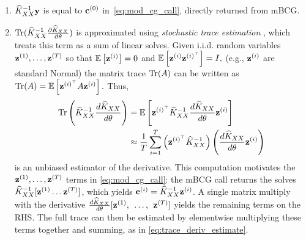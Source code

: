 \begin{enumerate}
  \item $\widehat{K}_{XX}^{-1}\mathbf{y}$ is equal to $\mathbf{c}^{(0)}$ in~\cref{eq:mod_cg_call}, directly returned from mBCG.

  \item $\tr{ \trainK^{-1} \frac{\partial \trainK}{\partial \theta} }$ is approximated using \emph{stochastic trace estimation} \cite{hutchinson1990stochastic,fitzsimons2016improved}, which treats this term as a sum of linear solves.
    Given i.i.d. random variables $\mathbf{z}^{(1)}, \ldots, \mathbf{z}^{(T)}$ so that $\operatorname*{\mathbb{E}} \left[ \mathbf{z}^{(i)} \right]=0$ and $\operatorname*{\mathbb{E}} \left[ \mathbf{z}^{(i)} \mathbf{z}^{(i)^\top} \right]=I,
    $ (e.g., $\mathbf{z}^{(i)}$ are standard Normal)
    the matrix trace $\tr{\bA}$ can be written as
    $
      \tr{\bA} = \Ev{\bz^{(i)^\top} \bA\bz^{(i)}}.
    $
    Thus,
    \begin{align}
      \tr{\trainK^{-1}\frac{d\trainK}{d\theta}} &= \Ev{\bz^{(i)^\top} \trainK^{-1} \frac{d\trainK}{d\theta} \bz^{(i)}}
      \nonumber \\
      &\approx \frac{1}{T}\sum_{i=1}^{T}\left(\bz^{(i)^\top} \trainK^{-1}\right)\left(\frac{d\trainK}{d\theta}\bz^{(i)} \right)
      \label{eq:trace_deriv_estimate}
    \end{align}
    is an unbiased estimator of the derivative. This computation motivates the $\mathbf{z}^{(1)}, \ldots, \mathbf{z}^{(T)}$ terms in \cref{eq:mod_cg_call}:
    the mBCG call returns the solves $\widehat{K}_{XX}^{-1}[\mathbf{z}^{(1)} \ldots \mathbf{z}^{(T)}]$, which yields $\mathbf{c}^{(i)} = \widehat{K}_{XX}^{-1} \mathbf{z}^{(i)}$.
    A single matrix multiply with the derivative $\frac{d\widehat{K}_{XX}}{d\theta}[\mathbf{z}^{(1)}, \:\: \ldots, \:\: \mathbf{z}^{(T)}]$ yields the remaining terms on the RHS.
    The full trace can then be estimated by elementwise multiplying these terms together and summing, as in \cref{eq:trace_deriv_estimate}.


\end{enumerate}
